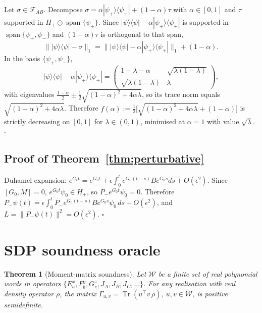 \documentclass[a4paper,onecolumn,noarxiv]{quantumarticle}
\theoremstyle{plain}
\newtheorem{theorem}{Theorem}
\theoremstyle{definition}
\theoremstyle{remark}
\newcommand{\Pminus}{P_{-}}
\newcommand{\Hplus}{H_{+}}
\newcommand{\Mop}{M}
\newcommand{\FAB}{\mathcal{F}_{AB}}
\newcommand{\Tr}{\operatorname{Tr}}
\newcommand{\Lleak}{L}
\begin{document}
Let $\sigma\in\FAB$. Decompose $\sigma=\alpha|\psi_+\rangle\langle\psi_+|+(1-\alpha)\tau$
with $\alpha\in[0,1]$ and $\tau$ supported in $\Hplus\ominus\operatorname{span}\{\psi_+\}$.
Since $|\psi\rangle\langle\psi|-\alpha|\psi_+\rangle\langle\psi_+|$ is supported in
$\operatorname{span}\{\psi_+,\psi_-\}$ and $(1-\alpha)\tau$ is orthogonal to that
span,
\[
  \bigl\||\psi\rangle\langle\psi|-\sigma\bigr\|_1
  = \bigl\||\psi\rangle\langle\psi|-\alpha|\psi_+\rangle\langle\psi_+|\bigr\|_1
  + (1-\alpha).
\]
In the basis $\{\psi_+,\psi_-\}$,
\[
  |\psi\rangle\langle\psi|-\alpha|\psi_+\rangle\langle\psi_+|
  = \begin{pmatrix} 1-\lambda-\alpha & \sqrt{\lambda(1-\lambda)} \\
    \sqrt{\lambda(1-\lambda)} & \lambda \end{pmatrix},
\]
with eigenvalues $\tfrac{1-\alpha}{2}\pm\tfrac{1}{2}\sqrt{(1-\alpha)^2+4\alpha\lambda}$,
so its trace norm equals $\sqrt{(1-\alpha)^2+4\alpha\lambda}$. Therefore
$f(\alpha):=\tfrac{1}{2}\bigl[\sqrt{(1-\alpha)^2+4\alpha\lambda}+(1-\alpha)\bigr]$
is strictly decreasing on $[0,1]$ for $\lambda\in(0,1)$, minimised at $\alpha=1$
with value $\sqrt{\lambda}$. \hfill$\square$

\subsection*{Proof of Theorem~\ref{thm:perturbative}}

Duhamel expansion: $e^{G_\epsilon t}=e^{G_0 t}+\epsilon\int_0^t e^{G_0(t-s)}Be^{G_0 s}ds
+O(\epsilon^2)$. Since $[G_0,\Mop]=0$, $e^{G_0 t}\psi_0\in\Hplus$, so
$\Pminus e^{G_0 t}\psi_0=0$. Therefore
$\Pminus\psi(t)=\epsilon\int_0^t\Pminus e^{G_0(t-s)}Be^{G_0 s}\psi_0\,ds+O(\epsilon^2)$,
and $\Lleak=\|\Pminus\psi(t)\|^2=O(\epsilon^2)$. \hfill$\square$

\section{SDP soundness oracle}
\label{app:sdp}

\begin{theorem}[Moment-matrix soundness]
\label{thm:moments}
Let $\mathcal{W}$ be a finite set of real polynomial words in operators
$\{E_a^x,F_b^y,G_c^z,J_A,J_B,J_C,\ldots\}$. For any realisation with real density
operator $\rho$, the matrix $\Gamma_{u,v}=\Tr(u^\top v\,\rho)$, $u,v\in\mathcal{W}$,
is positive semidefinite.
\end{theorem}
\end{document}
